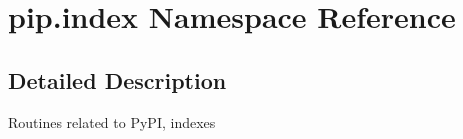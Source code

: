 \hypertarget{namespacepip_1_1index}{}\section{pip.\+index Namespace Reference}
\label{namespacepip_1_1index}


\subsection{Detailed Description}
\begin{DoxyVerb}Routines related to PyPI, indexes\end{DoxyVerb}
 
